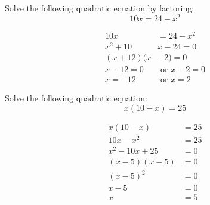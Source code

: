 \documentclass[11pt,letterpaper]{article}
\begin{document}
 Solve the following quadratic equation by factoring:
	\[
	10x= 24 - x^2
	\] \pspace

\sol
	\[
	\begin{aligned}
	10x&= 24 - x^2 \\[0.3cm]
	x^2 + 10&x - 24= 0 \\[0.3cm]
	(x + 12)(x &- 2)= 0 \\[0.3cm]
	x + 12= 0 &\text{  or  } x - 2= 0 \\[0.3cm]
	x= -12 &\text{  or  } x= 2
	\end{aligned}
	\]



\newpage



 Solve the following quadratic equation:
	\[
	x(10 - x)= 25
	\] \pspace

\sol
	\[
	\begin{aligned}
	x(10 - x)&= 25 \\[0.3cm]
	10x - x^2&= 25 \\[0.3cm]
	x^2 - 10x + 25&= 0 \\[0.3cm]
	(x - 5)(x - 5)&= 0 \\[0.3cm]
	(x - 5)^2&= 0 \\[0.3cm]
	x - 5&= 0 \\[0.3cm]
	x&= 5
	\end{aligned}
	\]
\end{document}
